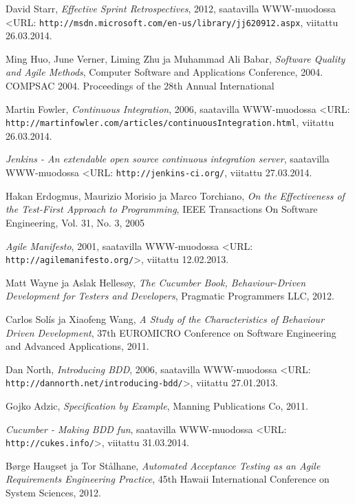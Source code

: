\documentclass[finnish,nonumbib,nocopyright]{gradu2}
\begin{document}
\begin{thebibliography}{9}
David Starr, \textit{Effective Sprint Retrospectives}, 2012, saatavilla WWW-muodossa
<URL: \texttt{http://msdn.microsoft.com/en-us/library/jj620912.aspx}, viitattu 26.03.2014.

Ming Huo, June Verner, Liming Zhu ja Muhammad Ali Babar, \textit{Software Quality and Agile Methods}, 
Computer Software and Applications Conference, 2004. COMPSAC 2004. Proceedings of the 28th Annual International

Martin Fowler, \textit{Continuous Integration}, 2006, saatavilla WWW-muodossa
<URL: \texttt{http://martinfowler.com/articles/continuousIntegration.html}, viitattu 26.03.2014.

\textit{Jenkins - An extendable open source continuous integration server}, saatavilla WWW-muodossa
<URL: \texttt{http://jenkins-ci.org/}, viitattu 27.03.2014.

Hakan Erdogmus, Maurizio Morisio ja Marco Torchiano, \textit{On the Effectiveness of the Test-First Approach to Programming}, IEEE Transactions On Software Engineering, Vol. 31, No. 3, 2005

\textit{Agile Manifesto}, 2001, saatavilla WWW-muodossa
<URL: \texttt{http://agilemanifesto.org/}>, viitattu 12.02.2013.

Matt Wayne ja Aslak Hellesøy, \textit{The Cucumber Book, Behaviour-Driven Development for Testers and Developers},
Pragmatic Programmers LLC, 2012.

Carlos Solís ja Xiaofeng Wang, \textit{A Study of the Characteristics of Behaviour Driven Development},
37th EUROMICRO Conference on Software Engineering and Advanced Applications, 2011.

Dan North, \textit{Introducing BDD}, 2006, saatavilla WWW-muodossa
<URL: \texttt{http://dannorth.net/introducing-bdd/}>, viitattu 27.01.2013.

Gojko Adzic, \textit{Specification by Example},
Manning Publications Co, 2011.

\textit{Cucumber - Making BDD fun}, saatavilla WWW-muodossa
<URL: \texttt{http://cukes.info/}>, viitattu 31.03.2014.

Børge Haugset ja Tor Stålhane, \textit{Automated Acceptance Testing as an Agile Requirements Engineering Practice},
45th Hawaii International Conference on System Sciences, 2012.


\end{thebibliography}
\end{document}
